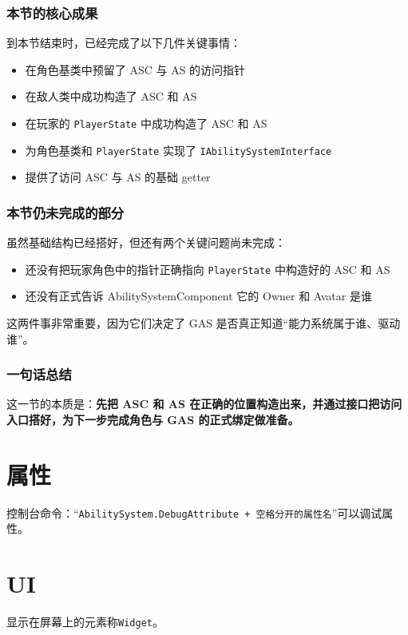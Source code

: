 \subsection{本节的核心成果}

到本节结束时，已经完成了以下几件关键事情：

\begin{itemize}
	\item 在角色基类中预留了 ASC 与 AS 的访问指针
	\item 在敌人类中成功构造了 ASC 和 AS
	\item 在玩家的 \texttt{PlayerState} 中成功构造了 ASC 和 AS
	\item 为角色基类和 \texttt{PlayerState} 实现了 \texttt{IAbilitySystemInterface}
	\item 提供了访问 ASC 与 AS 的基础 getter
\end{itemize}

\subsection{本节仍未完成的部分}

虽然基础结构已经搭好，但还有两个关键问题尚未完成：

\begin{itemize}
	\item 还没有把玩家角色中的指针正确指向 \texttt{PlayerState} 中构造好的 ASC 和 AS
	\item 还没有正式告诉 AbilitySystemComponent 它的 Owner 和 Avatar 是谁
\end{itemize}

这两件事非常重要，因为它们决定了 GAS 是否真正知道“能力系统属于谁、驱动谁”。

\subsection{一句话总结}

这一节的本质是：\textbf{先把 ASC 和 AS 在正确的位置构造出来，并通过接口把访问入口搭好，为下一步完成角色与 GAS 的正式绑定做准备。}
\chapter{属性}
控制台命令：“\texttt{AbilitySystem.DebugAttribute + 空格分开的属性名}”可以调试属性。


\chapter{UI}
显示在屏幕上的元素称\texttt{Widget}。
